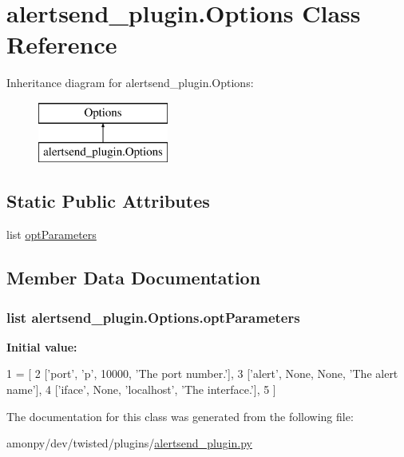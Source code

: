 \hypertarget{classalertsend__plugin_1_1_options}{\section{alertsend\-\_\-plugin.\-Options Class Reference}
\label{classalertsend__plugin_1_1_options}
}
Inheritance diagram for alertsend\-\_\-plugin.\-Options\-:\begin{figure}[H]
\begin{center}
\leavevmode
\includegraphics[height=2.000000cm]{classalertsend__plugin_1_1_options}
\end{center}
\end{figure}
\subsection*{Static Public Attributes}
\begin{DoxyCompactItemize}
\item 
list \hyperlink{classalertsend__plugin_1_1_options_a2c75b6ad0c6ebcf82a12c75c4fe17c82}{opt\-Parameters}
\end{DoxyCompactItemize}


\subsection{Member Data Documentation}
\hypertarget{classalertsend__plugin_1_1_options_a2c75b6ad0c6ebcf82a12c75c4fe17c82}{
\subsubsection[{opt\-Parameters}]{\setlength{\rightskip}{0pt plus 5cm}list alertsend\-\_\-plugin.\-Options.\-opt\-Parameters\hspace{0.3cm}{\ttfamily [static]}}}\label{classalertsend__plugin_1_1_options_a2c75b6ad0c6ebcf82a12c75c4fe17c82}
{\bfseries Initial value\-:}
\begin{DoxyCode}
1 = [
2         [\textcolor{stringliteral}{'port'}, \textcolor{stringliteral}{'p'}, 10000, \textcolor{stringliteral}{'The port number.'}],
3         [\textcolor{stringliteral}{'alert'}, \textcolor{keywordtype}{None}, \textcolor{keywordtype}{None}, \textcolor{stringliteral}{'The alert name'}],
4         [\textcolor{stringliteral}{'iface'}, \textcolor{keywordtype}{None}, \textcolor{stringliteral}{'localhost'}, \textcolor{stringliteral}{'The interface.'}],
5         ]
\end{DoxyCode}


The documentation for this class was generated from the following file\-:\begin{DoxyCompactItemize}
\item 
amonpy/dev/twisted/plugins/\hyperlink{alertsend__plugin_8py}{alertsend\-\_\-plugin.\-py}\end{DoxyCompactItemize}
